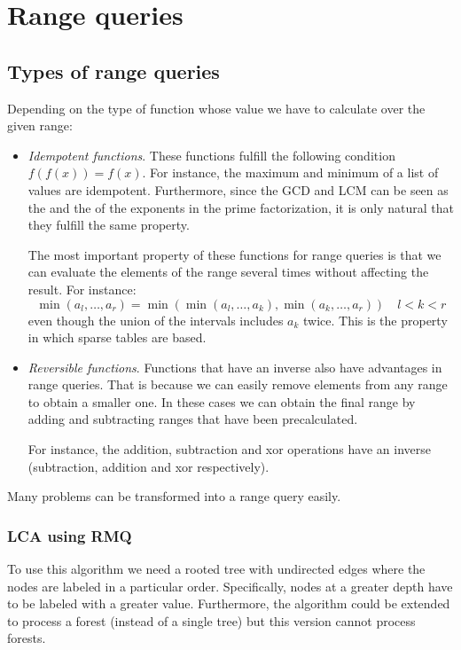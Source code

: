 
\chapter{Range queries}

\section{Types of range queries}
Depending on the type of function whose value we have to calculate over
the given range:
\begin{itemize}
		\item \textit{Idempotent functions}. These functions fulfill the 
				following condition $f(f(x))=f(x)$. For instance, the maximum
				and minimum of a list of values are idempotent. 
				Furthermore, since the GCD and LCM can be seen as 
				the  and the  of the exponents in the
				prime factorization, it is only natural that they fulfill the same 
				property.

				The most important property of these functions for range queries
				is that we can evaluate the elements of the range several times 
				without affecting the result. For instance:
				\[
						\min(a_l,\dots ,a_r)= \min \left (
								\min (a_l, \dots,  a_k), \min (a_{k},\dots, a_r)
						\right ) \quad l < k <r
				\]
				even though the union of the intervals includes $a_k$ twice.
				This is the property in which sparse tables are based.


		\item  \textit{Reversible functions}. Functions that have an inverse
				also have advantages in range queries. That is because we
				can easily remove elements from any range to obtain a smaller
				one. In these cases we can obtain the final range by adding
				and subtracting ranges that have been precalculated.

				For instance, the addition, subtraction and xor operations have 
				an inverse (subtraction, addition and xor respectively). 

\end{itemize}

\newpage
Many problems can be transformed into a range query easily.

\subsection{LCA using RMQ}
To use this algorithm we need a rooted tree with undirected edges where the 
nodes are labeled in a particular order. Specifically, nodes at a greater
depth have to be labeled with a greater value. Furthermore, the algorithm
could be extended to process a forest (instead of a single tree) but 
this version cannot process forests.

